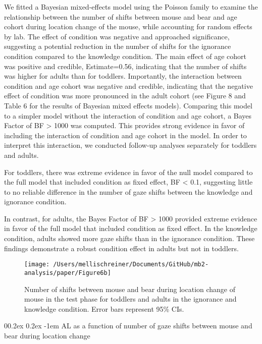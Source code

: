 \documentclass[
  man,floatsintext]{apa6}
\makeatletter
\let\oldparagraph\paragraph
\renewcommand{\paragraph}{
    \@ifstar
      \xxxParagraphStar
      \xxxParagraphNoStar
  }
\newcommand{\xxxParagraphStar}[1]{\oldparagraph*{#1}\mbox{}}
\newcommand{\xxxParagraphNoStar}[1]{\oldparagraph{#1}\mbox{}}
\renewcommand{\paragraph}{\@startsection{paragraph}{4}{\parindent}%
  {0\baselineskip \@plus 0.2ex \@minus 0.2ex}%
  {-1em}%
  {\normalfont\normalsize\bfseries\itshape\typesectitle}}
\makeatother
\begin{document}
We fitted a Bayesian mixed-effects model using the Poisson family to examine the relationship between the number of shifts between mouse and bear and age cohort during location change of the mouse, while accounting for random effects by lab. The effect of condition was negative and approached significance, suggesting a potential reduction in the number of shifts for the ignorance condition compared to the knowledge condition. The main effect of age cohort was positive and credible, Estimate=0.56, indicating that the number of shifts was higher for adults than for toddlers. Importantly, the interaction between condition and age cohort was negative and credible, indicating that the negative effect of condition was more pronounced in the adult cohort (see Figure 8 and Table 6 for the results of Bayesian mixed effects models).
Comparing this model to a simpler model without the interaction of condition and age cohort, a Bayes Factor of BF \textgreater{} 1000 was computed.
This provides strong evidence in favor of including the interaction of condition and age cohort in the model. In order to interpret this interaction, we conducted follow-up analyses separately for toddlers and adults.

For toddlers, there was extreme evidence in favor of the null model compared to the full model that included condition as fixed effect, BF \textless{} 0.1, suggesting little to no reliable difference in the number of gaze shifts between the knowledge and ignorance condition.

In contrast, for adults, the Bayes Factor of BF \textgreater{} 1000 provided extreme evidence in favor of the full model that included condition as fixed effect. In the knowledge condition, adults showed more gaze shifts than in the ignorance condition. These findings demonstrate a robust condition effect in adults but not in toddlers.

\begin{figure}

{\centering \texttt{[image: /Users/mellischreiner/Documents/GitHub/mb2-analysis/paper/Figure6b]} 

}

\caption{Number of shifts between mouse and bear during location change of mouse in the test phase for toddlers and adults in the ignorance and knowledge condition. Error bars represent 95\% CIs.}\label{fig:fig8}
\end{figure}

\paragraph{AL as a function of number of gaze shifts between mouse and bear during location change}\label{al-as-a-function-of-number-of-gaze-shifts-between-mouse-and-bear-during-location-change}
\end{document}

